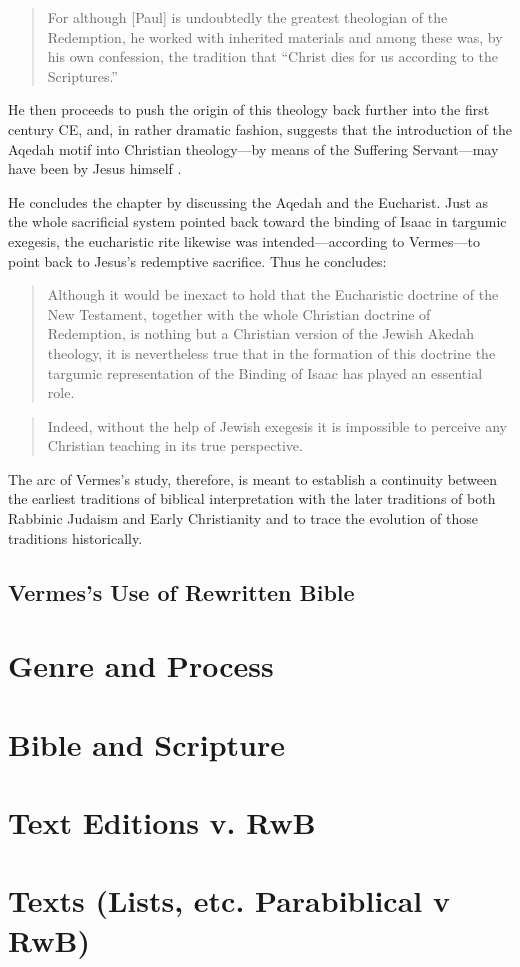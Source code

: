 \begin{quote}
For although {[}Paul{]} is undoubtedly the greatest theologian of the
Redemption, he worked with inherited materials and among these was, by
his own confession, the tradition that ``Christ dies for us according to
the Scriptures.''\autocite[221]{vermes1961}
\end{quote}

He then proceeds to push the origin of this theology back further into
the first century CE, and, in rather dramatic fashion, suggests that the
introduction of the Aqedah motif into Christian theology---by means of
the Suffering Servant---may have been by Jesus himself
\autocite[223]{vermes1961}.

He concludes the chapter by discussing the Aqedah and the Eucharist.
Just as the whole sacrificial system pointed back toward the binding of
Isaac in targumic exegesis, the eucharistic rite likewise was
intended---according to Vermes---to point back to Jesus's redemptive
sacrifice. Thus he concludes:

\begin{quote}
Although it would be inexact to hold that the Eucharistic doctrine of
the New Testament, together with the whole Christian doctrine of
Redemption, is nothing but a Christian version of the Jewish Akedah
theology, it is nevertheless true that in the formation of this doctrine
the targumic representation of the Binding of Isaac has played an
essential role.
\end{quote}

\begin{quote}
Indeed, without the help of Jewish exegesis it is impossible to perceive
any Christian teaching in its true
perspective.\autocite[227]{vermes1961}
\end{quote}

The arc of Vermes's study, therefore, is meant to establish a continuity
between the earliest traditions of biblical interpretation with the
later traditions of both Rabbinic Judaism and Early Christianity and to
trace the evolution of those traditions historically.

\subsection{Vermes's Use of Rewritten
Bible}\label{vermess-use-of-rewritten-bible}

\section{Genre and Process}\label{genre-and-process}

\section{Bible and Scripture}\label{bible-and-scripture}

\section{Text Editions v. RwB}\label{text-editions-v.-rwb}

\section*{Texts (Lists, etc. Parabiblical v
RwB)}\label{texts-lists-etc.-parabiblical-v-rwb}

